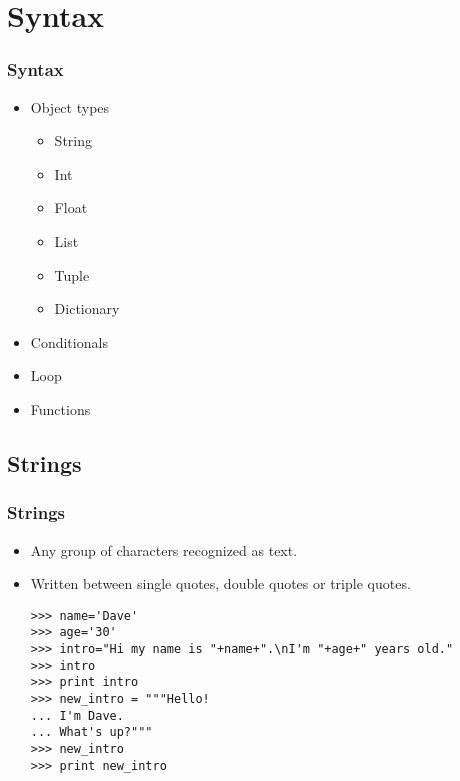 \documentclass[xcolor=x11names,compress]{beamer}
\renewcommand{\(}{\begin{columns}}
\renewcommand{\)}{\end{columns}}
\newcommand{\<}[1]{\begin{column}{#1}}
\renewcommand{\>}{\end{column}}
\begin{document}
\section{Syntax}
\begin{frame}
\frametitle{Syntax}
\begin{itemize}
\item Object types
\begin{itemize}
\item String
\item Int
\item Float
\item List
\item Tuple
\item Dictionary
\end{itemize}
\item Conditionals
\item Loop
\item Functions
\end{itemize}
\end{frame}

\subsection{Strings}
\begin{frame}[fragile]
\frametitle{Strings}
\begin{itemize}
\item Any group of characters recognized as text. \pause
\item Written between single quotes, double quotes or triple quotes. \pause
\begin{verbatim}
>>> name='Dave'
>>> age='30'
>>> intro="Hi my name is "+name+".\nI'm "+age+" years old."
>>> intro
>>> print intro
>>> new_intro = """Hello!
... I'm Dave.
... What's up?"""
>>> new_intro
>>> print new_intro
\end{verbatim}
\end{itemize}
\end{frame}
\end{document}
